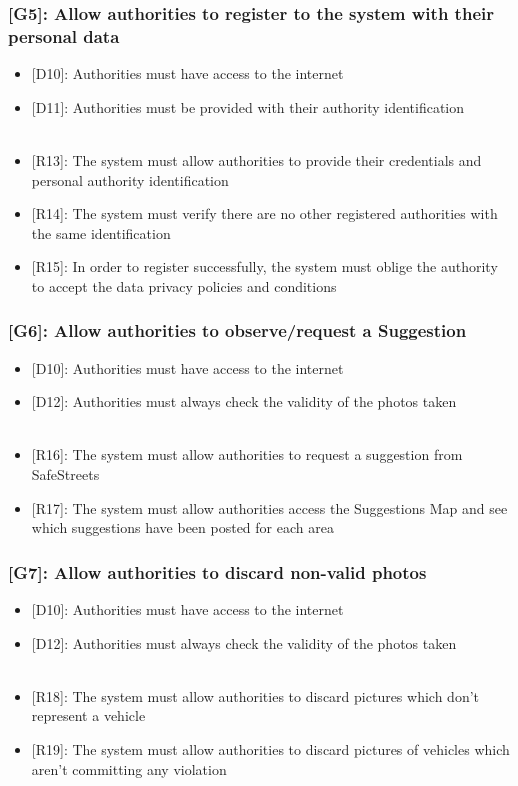 \documentclass[12pt,a4paper]{article}
\begin{document}
\subsubsection*{{[}{G5}{]}: Allow authorities to register to the system with their personal data}
\begin{itemize}
\item {[D10]}: Authorities must have access to the internet
\item {[D11]}: Authorities must be provided with their authority identification
\\\\
\item {[R13]}: The system must allow authorities to provide their credentials and personal authority identification
\item {[R14]}: The system must verify there are no other registered authorities with the same identification
\item {[R15]}: In order to register successfully, the system must oblige the authority to accept the data privacy policies and conditions
\end{itemize}
\subsubsection*{{[}{G6}{]}: Allow authorities to observe/request a Suggestion}
\begin{itemize}
\item {[D10]}: Authorities must have access to the internet
\item {[D12]}: Authorities must always check the validity of the photos taken
\\\\
\item {[R16]}: The system must allow authorities to request a suggestion from SafeStreets
\item {[R17]}: The system must allow authorities access the Suggestions Map and see which suggestions have been posted for each area
\end{itemize}
\subsubsection*{{[}{G7}{]}: Allow authorities to discard non-valid photos}
\begin{itemize}
\item {[D10]}: Authorities must have access to the internet
\item {[D12]}: Authorities must always check the validity of the photos taken
\\\\
\item {[R18]}: The system must allow authorities to discard pictures which don't represent a vehicle
\item {[R19]}: The system must allow authorities to discard pictures of vehicles which aren't committing any violation
\end{itemize}
\newpage
\end{document}
